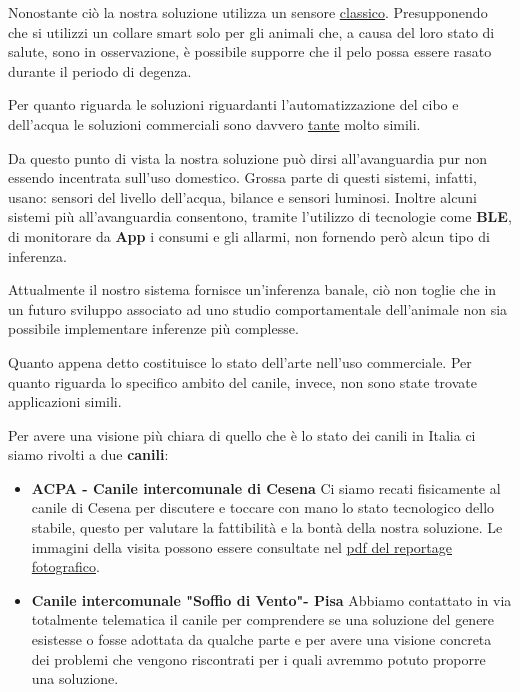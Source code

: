 Nonostante ciò la nostra soluzione utilizza un sensore
\href{https://www.amazon.it/Haljia-Sensore-frequenza-cardiaca-Raspberry/dp/B01CBGH4N6}{classico}. Presupponendo che si utilizzi un collare smart solo per gli animali che, a causa del loro stato di salute, sono in osservazione, è possibile supporre che il pelo possa essere rasato durante il periodo di degenza.

Per quanto riguarda le soluzioni riguardanti l'automatizzazione del cibo e dell'acqua le soluzioni commerciali sono davvero \href{https://www.fruugo.it/alimentatore-automatico-per-animali-domestici-a-43-l-capacita-alimentatore-intelligente-per-alimentazione-intelligente-per-lalimentazione-del-tempo-e-razionale-con-telecamera-telecomandato-tipo-di-lusso/p-55093501-111996468?language=it&ac=croud}{tante} molto simili.

Da questo punto di vista la nostra soluzione può dirsi all'avanguardia pur non essendo incentrata sull'uso domestico. Grossa parte di questi sistemi, infatti, usano: sensori del livello dell'acqua, bilance e sensori luminosi.
Inoltre alcuni sistemi più all'avanguardia consentono, tramite l'utilizzo di tecnologie come \textbf{BLE}, di monitorare da \textbf{App} i consumi e gli allarmi, non fornendo però alcun tipo di inferenza.

Attualmente il nostro sistema fornisce un'inferenza banale, ciò non toglie che in un futuro sviluppo associato ad uno studio comportamentale dell'animale non sia possibile implementare inferenze più complesse.

Quanto appena detto costituisce lo stato dell'arte nell'uso commerciale.
Per quanto riguarda lo specifico ambito del canile, invece, non sono state trovate applicazioni simili.

Per avere una visione più chiara di quello che è lo stato dei canili in Italia ci siamo rivolti a due \textbf{canili}:
\begin{itemize}
    \item \textbf{ACPA - Canile intercomunale di Cesena} Ci siamo recati fisicamente al canile di Cesena per discutere e toccare con mano lo stato tecnologico dello stabile, questo per valutare la fattibilità e la bontà della nostra soluzione. Le immagini della visita possono essere consultate nel \href{https://github.com/SmartDogHouse/SmartDogHouse-Report/tree/main/Extra/Foto_Canile.pdf}{pdf del reportage fotografico}.
    \item \textbf{Canile intercomunale "Soffio di Vento"- Pisa} Abbiamo contattato in via totalmente telematica il canile per comprendere se una soluzione del genere esistesse o fosse adottata da qualche parte e per avere una visione concreta dei problemi che vengono riscontrati per i quali avremmo potuto proporre una soluzione.
\end{itemize}

